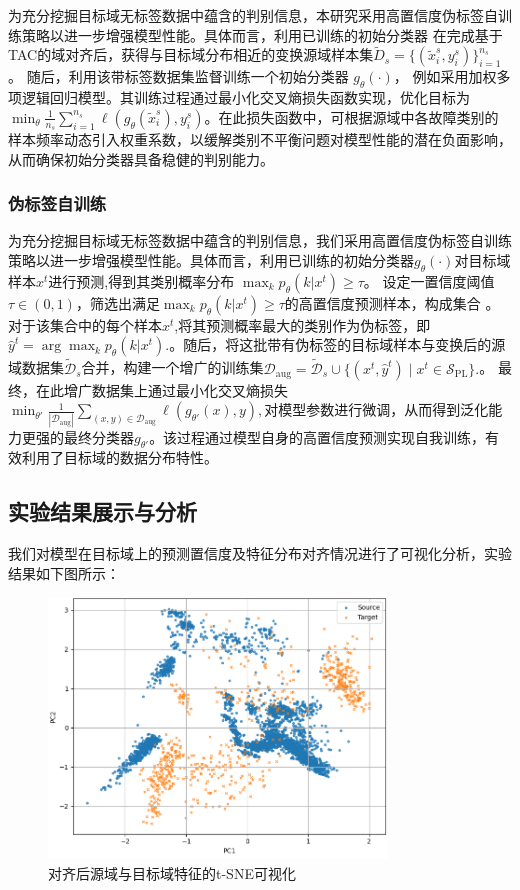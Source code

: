 \documentclass[a4paper]{CPIPC}
\numberwithin{equation}{section}
\begin{document}
为充分挖掘目标域无标签数据中蕴含的判别信息，本研究采用高置信度伪标签自训练策略以进一步增强模型性能。具体而言，利用已训练的初始分类器
在完成基于TAC的域对齐后，获得与目标域分布相近的变换源域样本集$\tilde{D}_s = \{(\tilde{x}_i^s, y_i^s)\}_{i=1}^{n_s}$。
随后，利用该带标签数据集监督训练一个初始分类器 $g_\theta(\cdot)$，
例如采用加权多项逻辑回归模型。其训练过程通过最小化交叉熵损失函数实现，优化目标为$\min_\theta \frac{1}{n_s} \sum_{i=1}^{n_s} \ell(g_\theta(\tilde{x}_i^s), y_i^s)$。在此损失函数中，可根据源域中各故障类别的样本频率动态引入权重系数，以缓解类别不平衡问题对模型性能的潜在负面影响，从而确保初始分类器具备稳健的判别能力。


\subsubsection{伪标签自训练}
为充分挖掘目标域无标签数据中蕴含的判别信息，我们采用高置信度伪标签自训练策略以进一步增强模型性能。具体而言，利用已训练的初始分类器$g_\theta(\cdot)$对目标域样本$x^t$进行预测,得到其类别概率分布
$ \max_k p_\theta(k|x^t) \geq \tau $。
设定一置信度阈值$\tau \in (0, 1)$，筛选出满足$ \max_k p_\theta(k|x^t) \geq \tau $的高置信度预测样本，构成集合 。
对于该集合中的每个样本$x^t$,将其预测概率最大的类别作为伪标签，即$ \hat{y}^t = \arg\max_k p_\theta(k|x^t). $。随后，将这批带有伪标签的目标域样本与变换后的源域数据集$\tilde{\mathcal{D}}_s$合并，构建一个增广的训练集$ \mathcal{D}_{\text{aug}} = \tilde{\mathcal{D}}_s \cup \{(x^t, \hat{y}^t) \mid x^t \in \mathcal{S}_{\text{PL}}\}. $。
最终，在此增广数据集上通过最小化交叉熵损失
$ \min_{\theta'} \frac{1}{|\mathcal{D}_{\text{aug}}|} \sum_{(x,y) \in \mathcal{D}_{\text{aug}}} \ell(g_{\theta'}(x), y), $对模型参数进行微调，从而得到泛化能力更强的最终分类器$g_{\theta'} $。该过程通过模型自身的高置信度预测实现自我训练，有效利用了目标域的数据分布特性。


\subsection{实验结果展示与分析}
我们对模型在目标域上的预测置信度及特征分布对齐情况进行了可视化分析，实验结果如下图所示：
\begin{figure}[H]
  \centering
  \includegraphics[width=0.8\textwidth]{对齐后源域与目标域特征的t-SNE可视化.png}
  \caption{对齐后源域与目标域特征的t-SNE可视化}
  \label{fig:tsne}
\end{figure}
\end{document}
